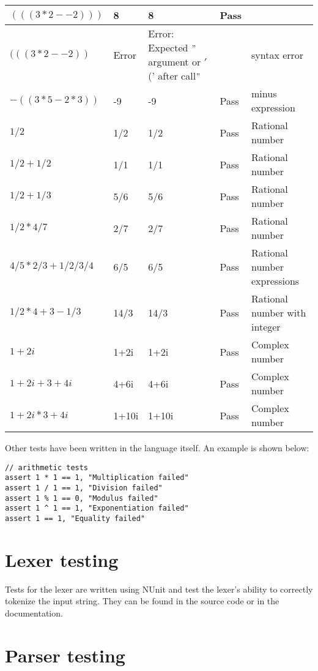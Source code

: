 \begin{table}[h]
\begin{tabular}{|p{1.8in}|p{0.5in}|p{0.4in}|p{0.6in}|p{1.4in}|}
    $(((3*2--2)))$ & 8 & 8 & Pass & \\ \hline
    $(((3*2--2))$ & Error & Error: Expected \("\)argument or \('\)(' after call\("\) & & syntax error \\ \hline
    $-((3*5-2*3))$ & -9 & -9 & Pass & minus expression \\ \hline
    $1/2$ & 1/2 & 1/2 & Pass & Rational number \\ \hline
    $1/2 + 1/2$ & 1/1 & 1/1 & Pass & Rational number \\ \hline
    $1/2 + 1/3$ & 5/6 & 5/6 & Pass & Rational number \\ \hline
    $1/2 * 4/7$ & 2/7 & 2/7 & Pass & Rational number \\ \hline 
    $4/5 * 2/3 + 1/2 / 3/4$ & 6/5 & 6/5 & Pass & Rational number expressions \\ \hline
    $1/2 * 4 + 3 - 1/3$ & 14/3 & 14/3 & Pass & Rational number with integer \\ \hline
    $1+2i$ & 1+2i & 1+2i & Pass & Complex number \\ \hline
    $1+2i + 3+4i$ & 4+6i & 4+6i & Pass & Complex number \\ \hline
    $1+2i * 3+4i$ & 1+10i & 1+10i & Pass & Complex number \\ \hline
    \end{tabular}
    \label{tab:table2}
\end{table}

Other tests have been written in the language itself.
An example is shown below:

\begin{verbatim}
// arithmetic tests
assert 1 * 1 == 1, "Multiplication failed"
assert 1 / 1 == 1, "Division failed"
assert 1 % 1 == 0, "Modulus failed"
assert 1 ^ 1 == 1, "Exponentiation failed"
assert 1 == 1, "Equality failed"
\end{verbatim}

\section{Lexer testing}\label{sec:lexer-testing}

Tests for the lexer are written using NUnit and test the lexer's ability to correctly tokenize the input string.
They can be found in the source code or in the documentation.

\section{Parser testing}\label{sec:parser-testing}

